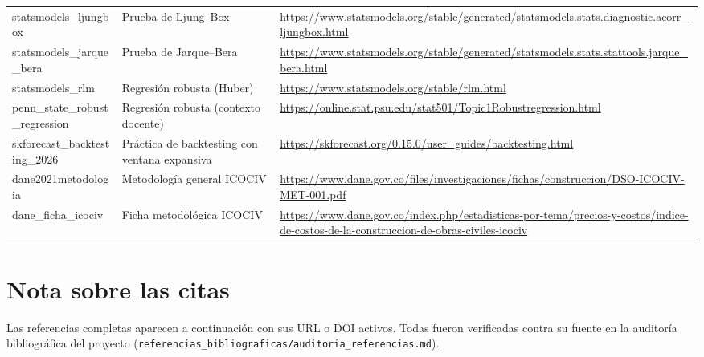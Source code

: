 \documentclass[12pt]{article}
\begin{document}
\begin{table}[H]
\begin{adjustbox}{max width=\textwidth}
\begin{tabular}{@{}p{3.6cm}p{5.2cm}p{7.2cm}@{}}
statsmodels\_ljungbox & Prueba de Ljung--Box & \url{https://www.statsmodels.org/stable/generated/statsmodels.stats.diagnostic.acorr_ljungbox.html} \\
statsmodels\_jarque\_bera & Prueba de Jarque--Bera & \url{https://www.statsmodels.org/stable/generated/statsmodels.stats.stattools.jarque_bera.html} \\
statsmodels\_rlm & Regresi\'on robusta (Huber) & \url{https://www.statsmodels.org/stable/rlm.html} \\
penn\_state\_robust\_regression & Regresi\'on robusta (contexto docente) & \url{https://online.stat.psu.edu/stat501/Topic1Robustregression.html} \\
skforecast\_backtesting\_2026 & Pr\'actica de backtesting con ventana expansiva & \url{https://skforecast.org/0.15.0/user_guides/backtesting.html} \\
dane2021metodologia & Metodolog\'ia general ICOCIV & \url{https://www.dane.gov.co/files/investigaciones/fichas/construccion/DSO-ICOCIV-MET-001.pdf} \\
dane\_ficha\_icociv & Ficha metodol\'ogica ICOCIV & \url{https://www.dane.gov.co/index.php/estadisticas-por-tema/precios-y-costos/indice-de-costos-de-la-construccion-de-obras-civiles-icociv} \\
\bottomrule
\end{tabular}
\end{adjustbox}
\end{table}

\section*{Nota sobre las citas}

Las referencias completas aparecen a continuaci\'on con sus URL o DOI activos. Todas fueron verificadas contra su fuente en la auditor\'ia bibliogr\'afica del proyecto (\texttt{referencias\_bibliograficas/auditoria\_referencias.md}).



\end{document}
